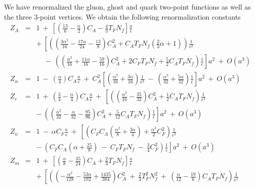 \documentclass[a4paper,11pt]{article}
\newcommand{\Nf}{N_{\!f}}
\begin{document}
We have renormalized the gluon, ghost and quark two-point functions as well
as the three $3$-point vertices. We obtain the following renormalization 
constants 
\begin{eqnarray} 
Z_A &=& 1 ~+~ \left[ \left( \frac{13}{6} - \frac{\alpha}{2} \right) C_A 
- \frac{4}{3} T_F \Nf \right] \frac{a}{\epsilon} \nonumber \\
&& +~ \left[ \left( \left( \frac{3\alpha^2}{16} - \frac{17\alpha}{24} 
- \frac{13}{8} \right) C_A^2 + C_A T_F\Nf \left( \frac{2}{3}\alpha + 1 \right) 
\right) \frac{1}{\epsilon^2} \right. \nonumber \\
&& \left. ~~~~~-~ \left( \left( \frac{\alpha^2}{16} + \frac{11\alpha}{16}
- \frac{59}{16} \right) C_A^2 + 2 C_F T_F\Nf + \frac{5}{2} C_A T_F \Nf \right) 
\frac{1}{\epsilon} \right] a^2 ~+~ O(a^3) \nonumber \\ 
Z_\alpha &=& 1 ~-~ \left( \frac{\alpha}{4} \right) C_A \frac{a}{\epsilon} ~+~ 
C_A^2 \left[ \left( \frac{\alpha^2}{16} + \frac{3\alpha}{16} 
\right) \frac{1}{\epsilon^2} ~-~ \left( \frac{\alpha^2}{32} 
+ \frac{5\alpha}{32} \right) \frac{1}{\epsilon} \right] a^2 ~+~ O(a^3) 
\nonumber \\ 
Z_c &=& 1 ~+~ \left( \frac{3}{4} - \frac{\alpha}{4} \right) C_A 
\frac{a}{\epsilon} ~+~ \left[ \left( \left( \frac{\alpha^2}{16} - \frac{35}{32}
\right) C_A^2 + \frac{1}{2} C_A T_F \Nf \right) \frac{1}{\epsilon^2} \right. 
\nonumber \\ 
&& \left. -~ \left( \left( \frac{\alpha^2}{32} - \frac{\alpha}{32} 
- \frac{95}{96} \right) C_A^2 + \frac{5}{12} C_A T_F \Nf \right) 
\frac{1}{\epsilon} \right] a^2 ~+~ O(a^3) \nonumber \\ 
Z_\psi &=& 1 ~-~ \alpha C_F \frac{a}{\epsilon} ~+~ \left[ \left( C_F C_A  
\left( \frac{\alpha^2}{8} + \frac{3\alpha}{4} \right) + \frac{\alpha^2}{2} 
C_F^2 \right) \frac{1}{\epsilon^2} \right. \nonumber \\ 
&& \left. -~ \left( C_F C_A \left( \alpha + \frac{25}{8} \right) ~-~ 
C_F T_F \Nf ~-~ \frac{3}{4} C_F^2 \right) \frac{1}{\epsilon} \right] a^2 ~+~ 
O(a^3) \nonumber \\ 
Z_m &=& 1 ~+~ \left[ \left( \frac{\alpha}{8} - \frac{35}{24} \right) C_A 
+ \frac{2}{3} T_F \Nf \right] \frac{a}{\epsilon} \nonumber \\
&& +~ \left[ \left( \left( - \frac{\alpha^2}{128} - \frac{53\alpha}{192} 
+ \frac{1435}{384} \right) C_A^2 ~+~ \frac{2}{3} T_F^2 \Nf^2 ~+~ \left( 
\frac{\alpha}{12} - \frac{19}{6} \right) C_A T_F \Nf \right) 
\frac{1}{\epsilon^2} \right.  \nonumber \\

\end{eqnarray}
\end{document}
